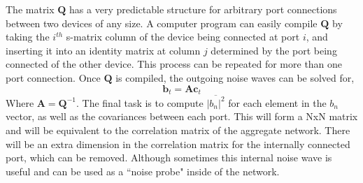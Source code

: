 \documentclass[journal]{IEEEtran}
\begin{document}
The matrix \(\mathbf{Q}\) has a very predictable structure for arbitrary port connections between two devices of any size. A computer program can easily compile \(\mathbf{Q}\) by taking the \(i^{th}\) s-matrix column of the device being connected at port \(i\), and inserting it into an identity matrix at column \(j\) determined by the port being connected of the other device. This process can be repeated for more than one port connection. Once \(\mathbf{Q}\) is compiled, the outgoing noise waves can be solved for,
%
\[\mathbf{b}_t = \mathbf{A} \mathbf{c}_t \]
Where \(\mathbf{A} = \mathbf{Q}^{-1}\).
The final task is to compute \(\overline{|b_n|^2}\) for each element in the \(b_n\) vector, as well as the covariances between each port. This will form a NxN matrix and will be equivalent to the correlation matrix of the aggregate network. There will be an extra dimension in the correlation matrix for the internally connected port, which can be removed. Although sometimes this internal noise wave is useful and can be used as a ``noise probe" inside of the network.
\end{document}
